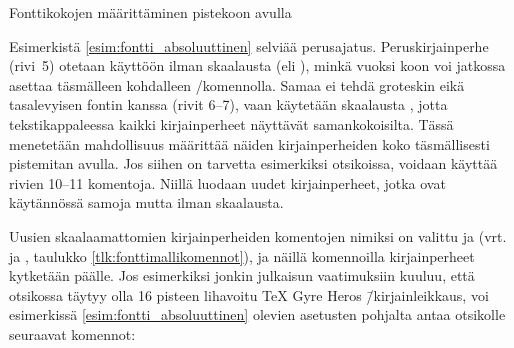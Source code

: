 \begin{esimerkki*}

\caption{Fonttikokojen määrittäminen pistekoon avulla}
\label{esim:fontti_absoluuttinen}
\end{esimerkki*}

Esimerkistä \ref{esim:fontti_absoluuttinen} selviää perusajatus.
Peruskirjainperhe (rivi~5) otetaan käyttöön ilman skaalausta (eli
), minkä vuoksi koon voi jatkossa asettaa täsmälleen
kohdalleen \-/komennolla. Samaa ei tehdä groteskin
eikä tasalevyisen fontin kanssa (rivit 6--7), vaan käytetään skaalausta
, jotta tekstikappaleessa kaikki kirjainperheet
näyttävät samankokoisilta. Tässä menetetään mahdollisuus määrittää
näiden kirjainperheiden koko täsmällisesti pistemitan avulla. Jos siihen
on tarvetta esimerkiksi otsikoissa, voidaan käyttää rivien 10--11
komentoja. Niillä luodaan uudet kirjainperheet, jotka ovat käytännössä
samoja mutta ilman skaalausta.

Uusien skaalaamattomien kirjainperheiden komentojen nimiksi on valittu
 ja  (vrt.
 ja , taulukko
\ref{tlk:fonttimallikomennot}), ja näillä komennoilla kirjainperheet
kytketään päälle. Jos esimerkiksi jonkin julkaisun vaatimuksiin kuuluu,
että otsikossa täytyy olla 16 pisteen lihavoitu TeX Gyre Heros
\=/kirjainleikkaus, voi esimerkissä \ref{esim:fontti_absoluuttinen}
olevien asetusten pohjalta antaa otsikolle seuraavat komennot:

